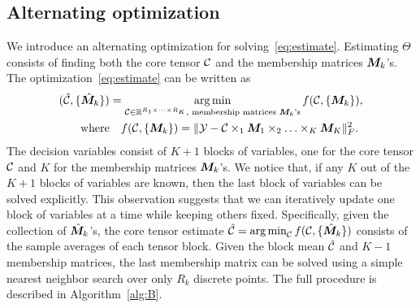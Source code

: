\documentclass[11pt]{article}
\theoremstyle{plain}
\theoremstyle{definition}
\begin{document}
\subsection{Alternating optimization}
We introduce an alternating optimization for solving~\eqref{eq:estimate}. Estimating $\Theta$ consists of finding both the core tensor $\mathcal{C}$ and the membership matrices $\bm M_k$'s. The optimization~\eqref{eq:estimate} can be written as
\begin{align}\label{eq:op}
(\hat {\mathcal{C}}, \{\hat {\bm M}_k\})&=\operatorname*{arg\,min}_{\mathcal{C}\in\mathbb{R}^{R_1\times \cdots \times R_K}, \text{ membership matrices $\bm M_k$'s}} f(\mathcal{C},\{\bm M_k\}),\notag\\
 \text{where}&\quad f(\mathcal{C},\{\bm M_k\})=\lVert\mathcal{Y}-\mathcal{C}\times_1\bm M_1\times_2\ldots\times_K\bm M_K\rVert_F^2.\notag
\end{align}
The decision variables consist of $K+1$ blocks of variables, one for the core tensor $\mathcal{C}$ and $K$ for the membership matrices $\bm M_k$'s. We notice that, if any $K$ out of the $K+1$ blocks of variables are known, then the last block of variables can be solved explicitly. This observation suggests that we can iteratively update one block of variables at a time while keeping others fixed. Specifically, given the collection of $\hat {\bm M}_k$'s, the core tensor estimate $\hat {\mathcal{C}}=\operatorname*{arg\,min}_{\mathcal{C}}f(\mathcal{C},\{\hat {\bm M}_k\})$ consists of the sample averages of each tensor block. Given the block mean $\hat {\mathcal{C}}$ and $K-1$ membership matrices, the last membership matrix can be solved using a simple nearest neighbor search over only $R_k$ discrete points. The full procedure is described in Algorithm~\ref{alg:B}.
\end{document}

